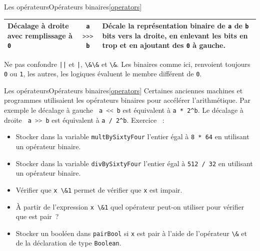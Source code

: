 \documentclass{beamer}
\begin{document}
\begin{frame}{Les opérateurs}{Opérateurs binaires\cref{operators}}
\begin{scriptsize}
\begin{table}[h!]
\begin{tabular}{|p{3cm}|c|p{6cm}|}
                    \hline
                    Décalage à droite avec remplissage à \lstinline{0} & \lstinline[language=Javascript]!a >>> b! & Décale la représentation binaire de \lstinline{a} de \lstinline{b} bits vers la droite, en enlevant les bits en trop et en ajoutant des \lstinline{0} à gauche.             \\
                    \hline
                \end{tabular}
            \end{table}
            \begin{dangercolorbox}
                Ne pas confondre \lstinline{||} et \lstinline{|}, \lstinline{\&\&} et \lstinline{\&}.
                Les binaires comme ici, renvoient toujours \lstinline{0} ou \lstinline{1}, les autres, les logiques évaluent le membre différent de \lstinline{0}.
            \end{dangercolorbox}
        \end{scriptsize}
    \end{frame}

    \begin{frame}{Les opérateurs}{Opérateurs binaires\cref{operators}}
        Certaines anciennes machines et programmes utilisaient les opérateurs binaires pour accélérer l'arithmétique.
        Par exemple le décalage à gauche \lstinline[language=Javascript]! a << b! est équivalent à \lstinline{a * 2^b}.
        Le décalage à droite \lstinline[language=Javascript]! a >> b! est équivalent à \lstinline{a / 2^b}.
        \bigbreak
        Exercice \execcounterdispinc{}~:
        \begin{itemize}
            \item Stocker dans la variable \lstinline{multBySixtyFour} l'entier égal à \lstinline{8 * 64} en utilisant un opérateur binaire.
            \item Stocker dans la variable \lstinline{divBySixtyFour} l'entier égal à \lstinline{512 / 32} en utilisant un opérateur binaire.
            \item Vérifier que \lstinline{x \&1} permet de vérifier que \lstinline{x} est impair.
            \item À partir de l'expression \lstinline{x \&1} quel opérateur peut-on utiliser pour vérifier que est pair~?
            \item Stocker un booléen dans \lstinline{pairBool} si \lstinline{x} est pair à l'aide de l'opérateur \lstinline{\&} et de la déclaration de type \lstinline{Boolean}.
        \end{itemize}
    \end{frame}
\end{document}
